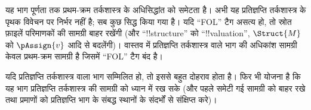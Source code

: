 \documentclass[../../include/open-logic-part]{subfiles}
\begin{document}

\begin{editorial}
  यह भाग पूर्णता तक प्रथम-क्रम तर्कशास्त्र के अधिसिद्धांत को समेटता है। अभी
  यह प्रतिज्ञप्ति तर्कशास्त्र के पृथक विवेचन पर निर्भर नहीं है; सब कुछ सिद्ध
  किया गया है। यदि ``FOL'' टैग असत्य हो, तो स्रोत फ़ाइलें परिमाणकों की सामग्री
  बाहर रखेंगी (और ``!!{structure}'' को ``!!{valuation}'', $\Struct{M}$ को
  $\pAssign{v}$ आदि से बदलेंगी)। वास्तव में प्रतिज्ञप्ति तर्कशास्त्र वाले भाग
  की अधिकांश सामग्री केवल प्रथम-क्रम सामग्री है जिसमें ``FOL'' टैग बंद है।

  यदि प्रतिज्ञप्ति तर्कशास्त्र वाला भाग सम्मिलित हो, तो इससे बहुत दोहराव होता
  है। फिर भी योजना है कि यह भाग प्रतिज्ञप्ति तर्कशास्त्र की सामग्री को ध्यान
  में रख सके (और पहले समेटी गई सामग्री को बाहर रखे तथा प्रमाणों को प्रतिज्ञप्ति
  भाग के संबद्ध स्थानों के संदर्भों से संक्षिप्त करे)।
\end{editorial}












\OLEndPartHook
\end{document}
